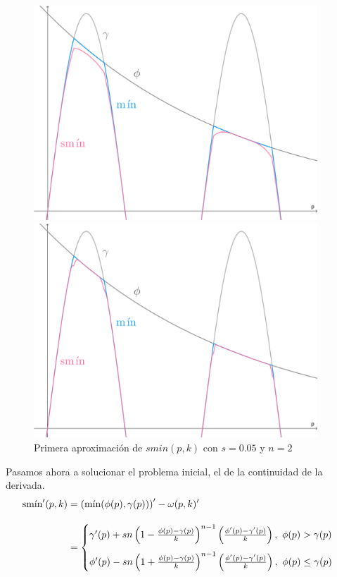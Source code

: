 \begin{figure}[!h]
     \begin{minipage}[c]{0.49\linewidth}
        \centering
        \includegraphics[width=0.95\textwidth]{Plantilla-TFG-master/img/smin_1.png}
        \caption{$k=0.6$}
     \end{minipage}
     \begin{minipage}[c]{0.49\linewidth}
        \centering
        \includegraphics[width=0.95\textwidth]{Plantilla-TFG-master/img/smin_2.png}
        \caption{$k=0.1$}
     \end{minipage}
     \caption{Primera aproximación de $smin(p,k)$ con $s=0.05$ y $n=2$}
     \label{fig:smooth1}
\end{figure}

 Pasamos ahora a solucionar el problema inicial, el de la continuidad de la derivada. 
\begin{align*}
    \smin'(p,k) &=  \left(\Min(\phi(p),\gamma(p))\right)' - \omega(p,k)'\\[10pt] &= \begin{cases}
        \gamma'(p) + sn\left(1-\frac{\phi(p)-\gamma(p)}{k}\right)^{n-1}\left(\frac{\phi'(p)-\gamma'(p)}{k}\right),\ \phi(p)>\gamma(p) \\[10pt] 
        \phi'(p) - sn\left(1+\frac{\phi(p)-\gamma(p)}{k}\right)^{n-1}\left(\frac{\phi'(p)-\gamma'(p)}{k}\right),\ \phi(p)\le \gamma(p)
    \end{cases}
\end{align*}

